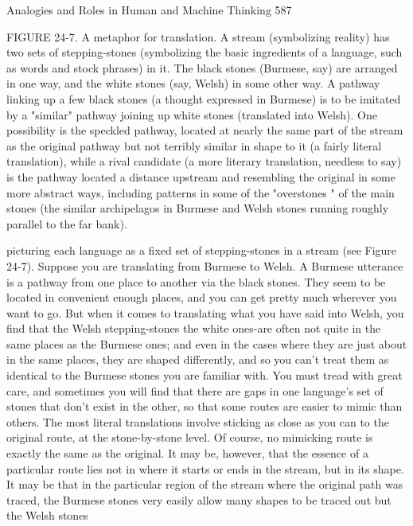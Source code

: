 Analogies and Roles in Human and Machine Thinking                                       587

FIGURE 24-7. A metaphor for translation. A stream (symbolizing reality) has two
sets of stepping-stones (symbolizing the basic ingredients of a language, such as
words and stock phrases) in it. The black stones (Burmese, say) are arranged in one
way, and the white stones (say, Welsh) in some other way. A pathway linking up a few
black stones (a thought expressed in Burmese) is to be imitated by a "similar"
pathway joining up white stones (translated into Welsh). One possibility is the
speckled pathway, located at nearly the same part of the stream as the original
pathway but not terribly similar in shape to it (a fairly literal translation), while a
rival candidate (a more literary translation, needless to say) is the pathway located a
distance upstream and resembling the original in some more abstract ways, including
patterns in some of the "overstones " of the main stones (the similar archipelagos in
Burmese and Welsh stones running roughly parallel to the far bank).

picturing each language as a fixed set of stepping-stones in a stream (see Figure 24-7).
Suppose you are translating from Burmese to Welsh. A Burmese utterance is a
pathway from one place to another via the black stones. They seem to be located in
convenient enough places, and you can get pretty much wherever you want to go. But
when it comes to translating what you have said into Welsh, you find that the Welsh
stepping-stones the white ones-are often not quite in the same places as the Burmese
ones; and even in the cases where they are just about in the same places, they are
shaped differently, and so you can't treat them as identical to the Burmese stones you
are familiar with. You must tread with great care, and sometimes you will find that
there are gaps in one language's set of stones that don't exist in the other, so that some
routes are easier to mimic than others. The most literal translations involve sticking as
close as you can to the original route, at the stone-by-stone level. Of course, no
mimicking route is exactly the same as the original.
        It may be, however, that the essence of a particular route lies not in where it
starts or ends in the stream, but in its shape. It may be that in the particular region of
the stream where the original path was traced, the Burmese stones very easily allow
many shapes to be traced out but the Welsh stones




